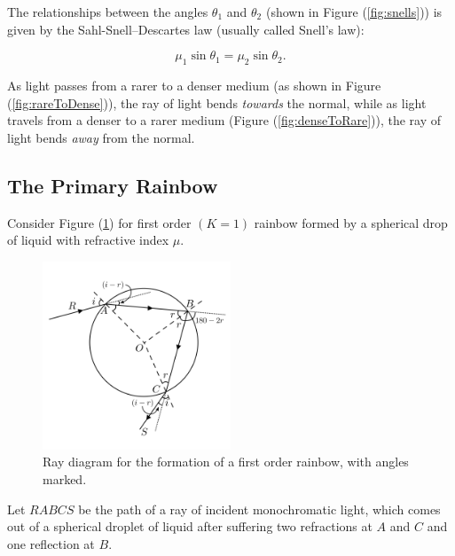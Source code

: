 The relationships between the angles $\theta_1$ and $\theta_2$ (shown in Figure (\ref{fig:snells})) is given by the Sahl-Snell–Descartes law (usually called Snell's law):

 \begin{equation}
    \mu_1 \sin{\theta_1}= \mu_2 \sin{\theta_2}.
    \label{snell}
 \end{equation}

As light passes from a rarer to a denser medium (as shown in Figure (\ref{fig:rareToDense})), the ray of light bends \textit{towards} the normal, while as light travels from a denser to a rarer medium (Figure (\ref{fig:denseToRare})), the ray of light bends \textit{away} from the normal. 



\subsection*{The Primary Rainbow}

Consider Figure (\ref{fig:firstOrder}) for first order $(K = 1)$ rainbow formed by a spherical drop of liquid with refractive index $\mu$.

\begin{figure}[!htb]
    \centering
    \includegraphics[width=0.5\textwidth]{figs/rainbow1.png}
    \caption{Ray diagram for the formation of a first order rainbow, with angles marked.}
    \label{fig:firstOrder}
\end{figure}


Let $RABCS$ be the path of a ray of incident monochromatic light, which comes out of a spherical droplet of liquid after suffering two refractions at $A$ and $C$ and one reflection at $B$.

